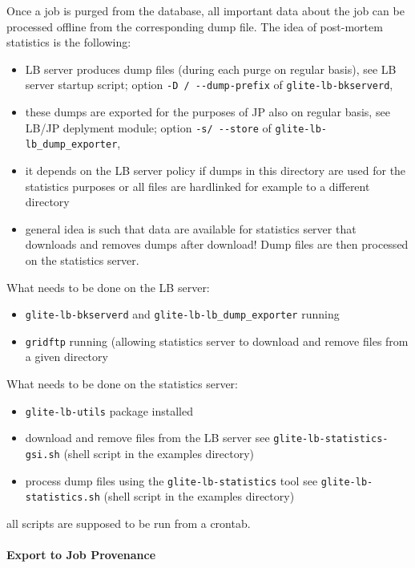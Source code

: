 Once a job is purged from the database, all important data about the job can be
processed offline from the corresponding dump file. The idea of post-mortem
statistics is the following:

\begin{itemize}
\item LB server produces dump files (during each purge on regular basis),
see LB server startup script; option \verb'-D / --dump-prefix' of \verb'glite-lb-bkserverd',
\item these dumps are exported for the purposes of JP also on regular basis,
see LB/JP deplyment module; option \verb'-s/ --store' of \verb'glite-lb-lb_dump_exporter',
\item it depends on the LB server policy if dumps in this directory are used for
the statistics purposes or all files are hardlinked for example to a different
directory
\item general idea is such that data are available for statistics server that downloads
and removes dumps after download! Dump files are then processed on the statistics
server.
\end{itemize}

What needs to be done on the LB server:
\begin{itemize}
\item \verb'glite-lb-bkserverd' and \verb'glite-lb-lb_dump_exporter' running
\item \verb'gridftp' running (allowing statistics server to download and remove files from 
a given directory
\end{itemize}


What needs to be done on the statistics server:
\begin{itemize}
\item \verb'glite-lb-utils' package installed
\item download and remove files from the LB server
see \verb'glite-lb-statistics-gsi.sh' (shell script in the examples directory)
\item process dump files using the \verb'glite-lb-statistics' tool
see \verb'glite-lb-statistics.sh' (shell script in the examples directory)
\end{itemize}
all scripts are supposed to be run from a crontab.


\paragraph{Export to Job Provenance}

